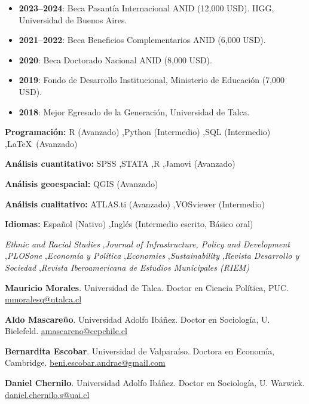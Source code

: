 \documentclass[10pt,letterpaper]{article}
\begin{document}

\begin{itemize}
    \item \textbf{2023--2024}: Beca Pasantía Internacional ANID (12,000 USD). IIGG, Universidad de Buenos Aires.
    \item \textbf{2021--2022}: Beca Beneficios Complementarios ANID (6,000 USD).
    \item \textbf{2020}: Beca Doctorado Nacional ANID (8,000 USD).
    \item \textbf{2019}: Fondo de Desarrollo Institucional, Ministerio de Educación (7,000 USD).
    \item \textbf{2018}: Mejor Egresado de la Generación, Universidad de Talca.
\end{itemize}


\noindent\textbf{Programación:} R (Avanzado) \sep Python (Intermedio) \sep SQL (Intermedio) \sep \LaTeX\ (Avanzado)

\noindent\textbf{Análisis cuantitativo:} SPSS \sep STATA \sep R \sep Jamovi (Avanzado)

\noindent\textbf{Análisis geoespacial:} QGIS (Avanzado)

\noindent\textbf{Análisis cualitativo:} ATLAS.ti (Avanzado) \sep VOSviewer (Intermedio)

\noindent\textbf{Idiomas:} Español (Nativo) \sep Inglés (Intermedio escrito, Básico oral)


\textit{Ethnic and Racial Studies} \sep \textit{Journal of Infrastructure, Policy and Development} \sep \textit{PLOSone} \sep \textit{Economía y Política} \sep \textit{Economies} \sep \textit{Sustainability} \sep \textit{Revista Desarrollo y Sociedad} \sep \textit{Revista Iberoamericana de Estudios Municipales (RIEM)}


\noindent\textbf{Mauricio Morales}. Universidad de Talca. Doctor en Ciencia Política, PUC. \href{mailto:mmoralesq@utalca.cl}{mmoralesq@utalca.cl}

\noindent\textbf{Aldo Mascareño}. Universidad Adolfo Ibáñez. Doctor en Sociología, U. Bielefeld. \href{mailto:amascareno@cepchile.cl}{amascareno@cepchile.cl}

\noindent\textbf{Bernardita Escobar}. Universidad de Valparaíso. Doctora en Economía, Cambridge. \href{mailto:beni.escobar.andrae@gmail.com}{beni.escobar.andrae@gmail.com}

\noindent\textbf{Daniel Chernilo}. Universidad Adolfo Ibáñez. Doctor en Sociología, U. Warwick. \href{mailto:daniel.chernilo.s@uai.cl}{daniel.chernilo.s@uai.cl}
\end{document}
